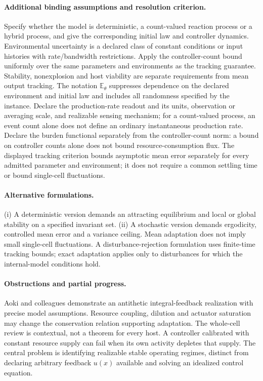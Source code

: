 \documentclass[11pt]{article}
\begin{document}
\paragraph{Additional binding assumptions and resolution criterion.} Specify whether the model is deterministic, a count-valued reaction process or a hybrid process, and give the corresponding initial law and controller dynamics. Environmental uncertainty is a declared class of constant conditions or input histories with rate/bandwidth restrictions. Apply the controller-count bound uniformly over the same parameters and environments as the tracking guarantee. Stability, nonexplosion and host viability are separate requirements from mean output tracking. The notation $\mathbb{E}_\theta$ suppresses dependence on the declared environment and initial law and includes all randomness specified by the instance. Declare the production-rate readout and its units, observation or averaging scale, and realizable sensing mechanism; for a count-valued process, an event count alone does not define an ordinary instantaneous production rate. Declare the burden functional separately from the controller-count norm: a bound on controller counts alone does not bound resource-consumption flux. The displayed tracking criterion bounds asymptotic mean error separately for every admitted parameter and environment; it does not require a common settling time or bound single-cell fluctuations.

\paragraph{Alternative formulations.} (i) A deterministic version demands an attracting equilibrium and local or global stability on a specified invariant set. (ii) A stochastic version demands ergodicity, controlled mean error and a variance ceiling. Mean adaptation does not imply small single-cell fluctuations. A disturbance-rejection formulation uses finite-time tracking bounds; exact adaptation applies only to disturbances for which the internal-model conditions hold.

\paragraph{Obstructions and partial progress.} Aoki and colleagues demonstrate an antithetic integral-feedback realization with precise model assumptions. Resource coupling, dilution and actuator saturation may change the conservation relation supporting adaptation. The whole-cell review is contextual, not a theorem for every host. A controller calibrated with constant resource supply can fail when its own activity depletes that supply. The central problem is identifying realizable stable operating regimes, distinct from declaring arbitrary feedback $u(x)$ available and solving an idealized control equation.
\end{document}

